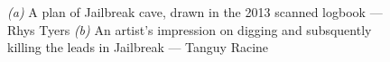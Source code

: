 	\begin{figure}[t!]
		\checkoddpage \ifoddpage \forcerectofloat \else \forceversofloat \fi
		\centering

		\begin{subfigure}{\textwidth}
			\centering
			\caption{}\label{}
		\end{subfigure}

		\begin{subfigure}{\textwidth}
			\centering
			\caption{}\label{}
		\end{subfigure}
	\caption{
		\emph{(a)} A plan of Jailbreak cave, drawn in the 2013 scanned logbook --- Rhys Tyers 
		\emph{(b)} An artist's impression on digging and subsquently killing the leads in Jailbreak --- Tanguy Racine
		}
	
	\end{figure}

